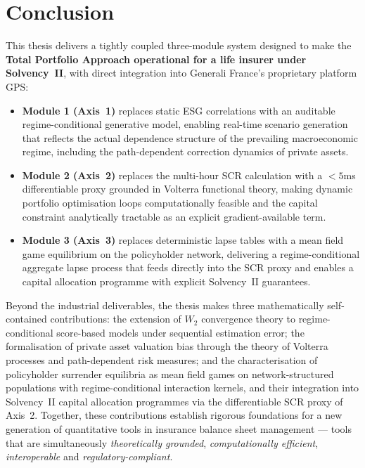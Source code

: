 \documentclass[11pt,a4paper]{article}
\begin{document}
\section{Conclusion}

This thesis delivers a tightly coupled three-module system designed to make the
\textbf{Total Portfolio Approach operational for a life insurer under
Solvency~II}, with direct integration into Generali France's proprietary
platform GPS:

\begin{itemize}[leftmargin=1.6em,itemsep=3pt]
  \item \textbf{Module 1 (Axis~1)} replaces static ESG correlations with an
        auditable regime-conditional generative model, enabling real-time
        scenario generation that reflects the actual dependence structure of
        the prevailing macroeconomic regime, including the path-dependent
        correction dynamics of private assets.

  \item \textbf{Module 2 (Axis~2)} replaces the multi-hour SCR calculation
        with a $<5$ms differentiable proxy grounded in Volterra functional
        theory, making dynamic portfolio optimisation loops computationally
        feasible and the capital constraint analytically tractable as an
        explicit gradient-available term.

  \item \textbf{Module 3 (Axis~3)} replaces deterministic lapse tables
        with a mean field game equilibrium on the policyholder network,
        delivering a regime-conditional aggregate lapse process that feeds
        directly into the SCR proxy and enables a capital allocation
        programme with explicit Solvency~II guarantees.
\end{itemize}

Beyond the industrial deliverables, the thesis makes three mathematically
self-contained contributions: the extension of $W_2$ convergence theory to
regime-conditional score-based models under sequential estimation error; the
formalisation of private asset valuation bias through the theory of Volterra
processes and path-dependent risk measures; and the characterisation of policyholder surrender equilibria as mean field
games on network-structured populations with regime-conditional interaction
kernels, and their integration into Solvency~II capital allocation programmes
via the differentiable SCR proxy of Axis~2. Together,
these contributions establish rigorous foundations for a new generation of
quantitative tools in insurance balance sheet management --- tools that are
simultaneously \emph{theoretically grounded}, \emph{computationally efficient},
\emph{interoperable} and \emph{regulatory-compliant}.
\end{document}
